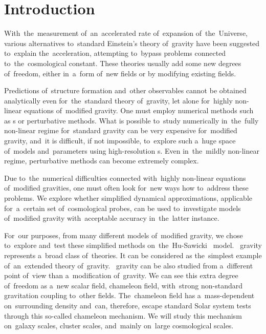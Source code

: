 \chapter{Introduction}
With~the~measurement of~an~accelerated rate of~expansion of~the~Universe, various alternatives to~standard Einstein's theory of~gravity have been suggested to~explain the~acceleration, attempting to~bypass problems connected to~the~cosmological constant. These theories usually add some new degrees of~freedom, either in~a~form of~new fields or by modifying existing fields.

Predictions of~structure formation and~other observables cannot be obtained analytically even for~the~standard theory of~gravity, let alone for~highly non-linear equations of~modified gravity. One must employ numerical methods such as \nbodysim s or perturbative methods. What is possible to~study numerically in~the~fully non-linear regime for~standard gravity can be very expensive for~modified gravity, and~it is difficult, if not impossible, to~explore such a~huge space of~models and~parameters using high-resolution \nbodysim s. Even in~the~mildly non-linear regime, perturbative methods can become extremely complex.

Due to~the~numerical difficulties connected with~highly non-linear equations of~modified gravities, one must often look for~new ways how to~address these problems. We explore whether simplified dynamical approximations, applicable for~a~certain set of~cosmological probes, can be used to~investigate models of~modified gravity with~acceptable accuracy in~the~latter instance.

For~our purposes, from many different models of~modified gravity, we chose to~explore and~test these simplified methods on~the~Hu-Sawicki \fR\ model. \fR\ gravity represents a~broad class of~theories. It can be considered as the~simplest example of~an~extended theory of~gravity. \fR\ gravity can be also studied from a~different point of~view than a~modification of~gravity. We can see this extra degree of~freedom as a~new scalar field, chameleon field, with~strong non-standard gravitation coupling to~other fields. The~chameleon field has a~mass-dependent on~surrounding density and~can, therefore, escape standard Solar system tests through this so-called chameleon mechanism. We will study this mechanism on~galaxy scales, cluster scales, and~mainly on~large cosmological scales.

